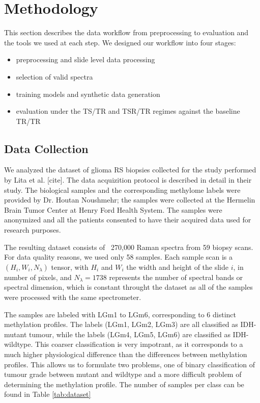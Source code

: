 \chapter{Methodology}

This section describes the data workflow from preprocessing to evaluation and the tools we used at each step. We designed our workflow into four stages:
\begin{itemize}
    \item preprocessing and slide level data processing
    \item selection of valid spectra
    \item training models and synthetic data generation
    \item evaluation under the TS/TR and TSR/TR regimes against the baseline TR/TR
\end{itemize}

\section{Data Collection}

We analyzed the dataset of glioma RS biopsies collected for the study performed by Lita et al. [cite]. The data acquizition protocol is described in detail in their study. The biological samples and the corresponding methylome labels were provided by Dr. Houtan Noushmehr; the samples were collected at the Hermelin Brain Tumor Center at Henry Ford Health System. The samples were anonymized and all the patients consented to have their acquired data used for research purposes.

The resulting dataset consists of ~270,000 Raman spectra from 59 biopsy scans. For data quality reasons, we used only 58 samples. Each sample scan is a $(H_i,W_i,N_\lambda)$ tensor, with $H_i$ and $W_i$ the width and height of the slide $i$, in number of pixels, and $N_\lambda = 1738$ represents the number of spectral bands or spectral dimension, which is constant throught the dataset as all of the samples were processed with the same spectrometer.

The samples are labeled with LGm1 to LGm6, corresponding to 6 distinct methylation profiles. The labels (LGm1, LGm2, LGm3) are all classified as IDH-mutant tumour, while the labels (LGm4, LGm5, LGm6) are classified as IDH-wildtype. This coarser classification is very impotrant, as it corresponds to a much higher physiological difference than the differences between methylation profiles. This allows us to formulate two problems, one of binary classification of tumour grade between mutant and wildtype and a more difficult problem of determining the methylation profile. The number of samples per class can be found in Table \ref{tab:dataset}


